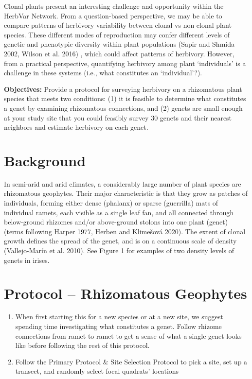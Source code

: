 \documentclass[
  letterpaper,
  oneside,
  open=any]{scrbook}
\begin{document}
Clonal plants present an interesting challenge and opportunity within
the HerbVar Network. From a question-based perspective, we may be able
to compare patterns of herbivory variability between clonal vs
non-clonal plant species. These different modes of reproduction may
confer different levels of genetic and phenotypic diversity within plant
populations (Sapir and Shmida 2002, Wilson et al. 2016) , which could
affect patterns of herbivory. However, from a practical perspective,
quantifying herbivory among plant `individuals' is a challenge in these
systems (i.e., what constitutes an `individual'?).

\textbf{Objectives:} Provide a protocol for surveying herbivory on a
rhizomatous plant species that meets two conditions: (1) it is feasible
to determine what constitutes a genet by examining rhizomatous
connections, and (2) genets are small enough at your study site that you
could feasibly survey 30 genets and their nearest neighbors and estimate
herbivory on each genet.

\section{Background}\label{background}

In semi-arid and arid climates, a considerably large number of plant
species are rhizomatous geophytes. Their major characteristic is that
they grow as patches of individuals, forming either dense (phalanx) or
sparse (guerrilla) mats of individual ramets, each visible as a single
leaf fan, and all connected through below-ground rhizomes and/or
above-ground stolons into one plant (genet) (terms following Harper
1977, Herben and Klimešová 2020). The extent of clonal growth defines
the spread of the genet, and is on a continuous scale of density
(Vallejo-Marín et al. 2010). See Figure 1 for examples of two density
levels of genets in irises.

\section{Protocol -- Rhizomatous
Geophytes}\label{protocol-rhizomatous-geophytes}

\begin{enumerate}
\def\labelenumi{\arabic{enumi}.}
\item
  When first starting this for a new species or at a new site, we
  suggest spending time investigating what constitutes a genet. Follow
  rhizome connections from ramet to ramet to get a sense of what a
  single genet looks like before following the rest of this protocol.
\item
  Follow the Primary Protocol \& Site Selection Protocol to pick a site,
  set up a transect, and randomly select focal quadrats' locations
\end{enumerate}
\end{document}
